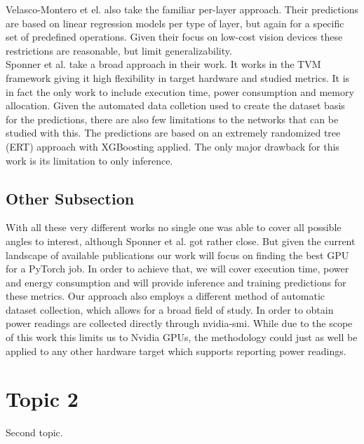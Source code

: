 Velasco-Montero et el. also take the familiar per-layer approach. Their predictions are based on linear
regression models per type of layer, but again for a specific set of predefined operations. Given their 
focus on low-cost vision devices these restrictions are reasonable, but limit generalizability. \\
Sponner et al. take a broad approach in their work. It works in the TVM framework giving it high flexibility
in target hardware and studied metrics. It is in fact the only work to include execution time, power
consumption and memory allocation. Given the automated data colletion used to create the dataset basis
for the predictions, there are also few limitations to the networks that can be studied with this. 
The predictions are based on an extremely randomized tree (ERT) approach with XGBoosting applied. The 
only major drawback for this work is its limitation to only inference. \\

\subsection{Other Subsection}
With all these very different works no single one was able to cover all possible angles to interest,
although Sponner et al. got rather close. But given the current landscape of available publications
our work will focus on finding the best GPU for a PyTorch job. In order to achieve that, we will cover
execution time, power and energy consumption and will provide inference and training predictions for these
metrics. Our approach also employs a different method of automatic dataset collection, which allows
for a broad field of study. In order to obtain power readings are collected directly through nvidia-smi.
While due to the scope of this work this limits us to Nvidia GPUs, the methodology could just as well be 
applied to any other hardware target which supports reporting power readings. \\

\section{Topic 2}
Second topic.
